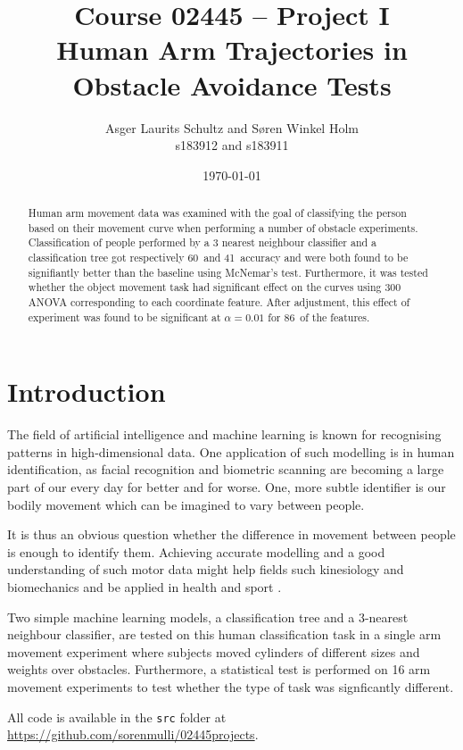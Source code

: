 \documentclass[11pt,fleqn]{article}
\title{Course 02445 -- Project I\\Human Arm Trajectories in Obstacle Avoidance Tests}
\author{Asger Laurits Schultz and Søren Winkel Holm\\s183912 and s183911}
\date{\today}
\begin{document}
\maketitle
\thispagestyle{empty}
\renewcommand{\abstractname}{Summary}

\clearpage
\setcounter{page}{1}
\begin{abstract}\noindent 
Human arm movement data was examined with the goal of classifying the person based on their movement curve when performing a number of obstacle experiments.
Classification of people performed by a 3 nearest neighbour classifier and a classification tree got respectively 60\pro\ and 41\pro\ accuracy and were both found to be signifiantly better than the baseline using McNemar's test.  
Furthermore, it was tested whether the object movement task had significant effect on the  curves using 300 ANOVA corresponding to each coordinate feature. 
After adjustment, this effect of experiment was found to be significant at \(\alpha=0.01\) for 86\pro\ of the features.
\end{abstract}



\section{Introduction}
The field of artificial intelligence and machine learning is known for recognising patterns in high-dimensional data. 
One application of such modelling is in human identification, as facial recognition and biometric scanning are becoming a large part of our every day for better and for worse. One, more subtle identifier is our bodily movement which can be imagined to vary between people.

It is thus an obvious question whether the difference in movement between people is enough to identify them. Achieving accurate modelling and a good understanding of such motor data might help fields such kinesiology and biomechanics and be applied in health and sport \cite{kine}.

Two simple machine learning models, a classification tree and a 3-nearest neighbour classifier, are tested on this human classification task in a single arm movement experiment where subjects moved cylinders of different sizes and weights over obstacles. Furthermore, a statistical test is performed on 16 arm movement experiments to test whether the type of task was signficantly different.

All code is available in the \texttt{src} folder at \url{https://github.com/sorenmulli/02445projects}.
\end{document}
